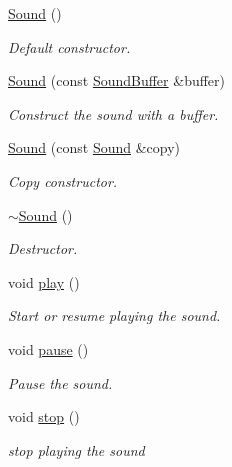 \begin{DoxyCompactItemize}
\item 
\mbox{\label{classsf_1_1_sound_a36ab74beaaa953d9879c933ddd246282}} 
\hyperlink{classsf_1_1_sound_a36ab74beaaa953d9879c933ddd246282}{Sound} ()
\begin{DoxyCompactList}\small\item\em Default constructor. \end{DoxyCompactList}\item 
\hyperlink{classsf_1_1_sound_a3b1cfc19a856d4ff8c079ee41bb78e69}{Sound} (const \hyperlink{classsf_1_1_sound_buffer}{Sound\+Buffer} \&buffer)
\begin{DoxyCompactList}\small\item\em Construct the sound with a buffer. \end{DoxyCompactList}\item 
\hyperlink{classsf_1_1_sound_ae05eeed6377932694d86b3011be366c0}{Sound} (const \hyperlink{classsf_1_1_sound}{Sound} \&copy)
\begin{DoxyCompactList}\small\item\em Copy constructor. \end{DoxyCompactList}\item 
\mbox{\label{classsf_1_1_sound_ad0792c35310eba2dffd8489c80fad076}} 
\hyperlink{classsf_1_1_sound_ad0792c35310eba2dffd8489c80fad076}{$\sim$\+Sound} ()
\begin{DoxyCompactList}\small\item\em Destructor. \end{DoxyCompactList}\item 
void \hyperlink{classsf_1_1_sound_a2953ffe632536e72e696fd880ced2532}{play} ()
\begin{DoxyCompactList}\small\item\em Start or resume playing the sound. \end{DoxyCompactList}\item 
void \hyperlink{classsf_1_1_sound_a5eeb25815bfa8cdc4a6cc000b7b19ad5}{pause} ()
\begin{DoxyCompactList}\small\item\em Pause the sound. \end{DoxyCompactList}\item 
void \hyperlink{classsf_1_1_sound_aa9c91c34f7c6d344d5ee9b997511f754}{stop} ()
\begin{DoxyCompactList}\small\item\em stop playing the sound \end{DoxyCompactList}\item 

\end{DoxyCompactItemize}
